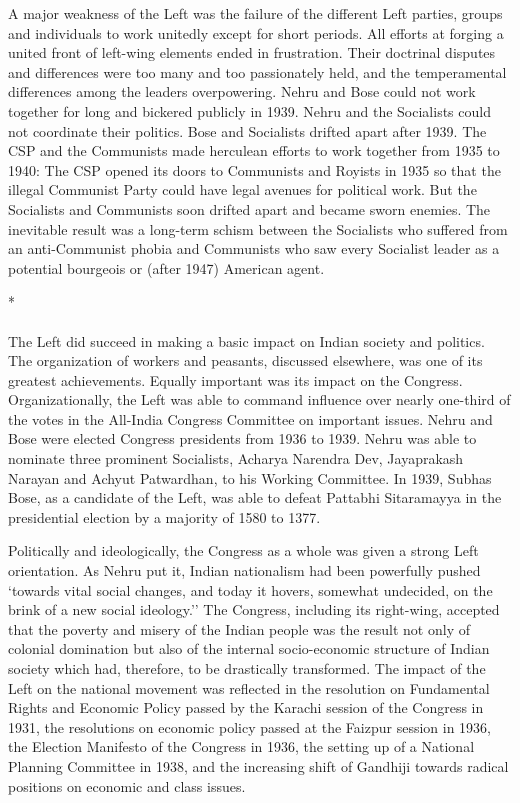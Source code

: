\begin{multicols}{2}
A major weakness of the Left was the failure of the different Left parties, groups and individuals to work unitedly except for short periods. All efforts at forging a united front of left-wing elements ended in frustration. Their doctrinal disputes and differences were too many and too passionately held, and the temperamental differences among the leaders overpowering. Nehru and Bose could not work together for long and bickered publicly in 1939. Nehru and the Socialists could not coordinate their politics. Bose and Socialists drifted apart after 1939. The CSP and the Communists made herculean efforts to work together from 1935 to 1940: The CSP opened its doors to Communists and Royists in 1935 so that the illegal Communist Party could have legal avenues for political work. But the Socialists and Communists soon drifted apart and became sworn enemies. The inevitable result was a long-term schism between the Socialists who suffered from an anti-Communist phobia and Communists who saw every Socialist leader as a potential bourgeois or (after 1947) American agent.

\begin{center}*\end{center}

\paragraph*{}

The Left did succeed in making a basic impact on Indian society and politics. The organization of workers and peasants, discussed elsewhere, was one of its greatest achievements. Equally important was its impact on the Congress. Organizationally, the Left was able to command influence over nearly one-third of the votes in the All-India Congress Committee on important issues. Nehru and Bose were elected Congress presidents from 1936 to 1939. Nehru was able to nominate three prominent Socialists, Acharya Narendra Dev, Jayaprakash Narayan and Achyut Patwardhan, to his Working Committee. In 1939, Subhas Bose, as a candidate of the Left, was able to defeat Pattabhi Sitaramayya in the presidential election by a majority of 1580 to 1377. 

Politically and ideologically, the Congress as a whole was given a strong Left orientation. As Nehru put it, Indian nationalism had been powerfully pushed `towards vital social changes, and today it hovers, somewhat undecided, on the brink of a new social ideology.'' The Congress, including its right-wing, accepted that the poverty and misery of the Indian people was the result not only of colonial domination but also of the internal socio-economic structure of Indian society which had, therefore, to be drastically transformed. The impact of the Left on the national movement was reflected in the resolution on Fundamental Rights and Economic Policy passed by the Karachi session of the Congress in 1931, the resolutions on economic policy passed at the Faizpur session in 1936, the Election Manifesto of the Congress in 1936, the setting up of a National Planning Committee in 1938, and the increasing shift of Gandhiji towards radical positions on economic and class issues.


\end{multicols}
